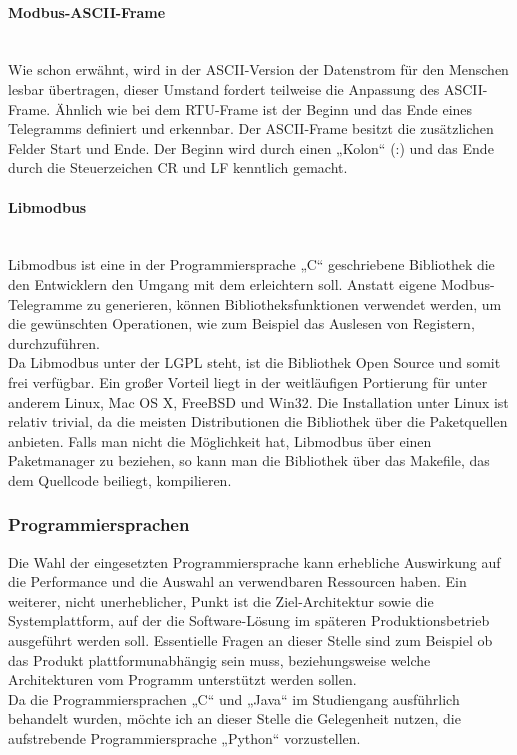 \documentclass[../Bachelorarbeit.tex]{subfiles}
\begin{document}
\paragraph{Modbus-\acs{ASCII}-Frame}\mbox{}\\
Wie schon erwähnt, wird in der \acs{ASCII}-Version der Datenstrom für den Menschen lesbar 
übertragen, dieser Umstand fordert teilweise die Anpassung des \acs{ASCII}-Frame. Ähnlich wie
bei dem \acs{RTU}-Frame ist der Beginn und das Ende eines Telegramms definiert und 
erkennbar. Der \acs{ASCII}-Frame besitzt die zusätzlichen Felder Start und Ende. Der Beginn 
wird durch einen „Kolon“ (:) und das Ende durch die Steuerzeichen \ac{CR} und \ac{LF} kenntlich gemacht. 
\parencite[vgl.][S. 80]{modbus_dipl_arbeit}

\paragraph{Libmodbus}\mbox{}\\
\label{para:libmodbus}
Libmodbus ist eine in der Programmiersprache „C“ geschriebene Bibliothek die den 
Entwicklern den Umgang mit dem  erleichtern soll. Anstatt eigene Modbus-Telegramme 
zu generieren, können Bibliotheksfunktionen verwendet werden, um die gewünschten 
Operationen, wie zum Beispiel das Auslesen von Registern, durchzuführen. \\
Da Libmodbus unter der \ac{LGPL} steht, ist die Bibliothek Open Source und somit frei verfügbar. Ein großer Vorteil liegt in der weitläufigen
Portierung für unter anderem Linux, Mac OS X, FreeBSD und Win32. Die Installation unter
Linux ist relativ trivial, da die meisten Distributionen die Bibliothek über die Paketquellen 
anbieten. Falls man nicht die Möglichkeit hat, Libmodbus über einen Paketmanager zu 
beziehen, so kann man die Bibliothek über das Makefile, das dem Quellcode beiliegt, 
kompilieren. 

\subsubsection*{Programmiersprachen}
Die Wahl der eingesetzten Programmiersprache kann erhebliche Auswirkung auf die 
Performance und die Auswahl an verwendbaren Ressourcen haben. Ein weiterer, nicht 
unerheblicher, Punkt ist die Ziel-Architektur sowie die Systemplattform, auf der die 
Software-Lösung im späteren Produktionsbetrieb ausgeführt werden soll. Essentielle 
Fragen an dieser Stelle sind zum Beispiel ob das Produkt plattformunabhängig sein muss,
beziehungsweise welche Architekturen vom Programm unterstützt werden sollen. \\
Da die Programmiersprachen „C“ und „Java“ im Studiengang ausführlich behandelt 
wurden, möchte ich an dieser Stelle die Gelegenheit nutzen, die aufstrebende 
Programmiersprache „Python“ vorzustellen.
\end{document}
